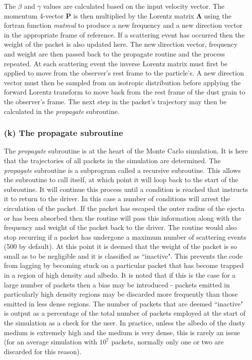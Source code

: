 		The $\beta$ and $\gamma$ values are calculated based on the input velocity vector.  The momentum 4-vector $\boldsymbol{P}$ is then multiplied by the Lorentz matrix $\boldsymbol{\Lambda}$ using the {\sc fortran} function \textit{matmul} to produce a  new frequency and a new direction vector in the appropriate frame of reference.  If a scattering event has occurred then the weight of the packet is also updated here.  The new direction vector, frequency and weight are then passed back to the propagate routine and the process repeated.   At each scattering event the inverse Lorentz matrix must first be applied to move from the observer's rest frame to the particle's.  A new direction vector must then be sampled from an isotropic distribution before applying the forward Lorentz transform to move back from the rest frame of the dust grain to the observer's frame.  The next step in the packet's trajectory may then be calculated in the \textit{propagate} subroutine.
		
		\subsubsection{(k) The propagate subroutine}
		The \textit{propagate} subroutine is at the heart of the Monte Carlo simulation.  It is here that the trajectories of all packets in the simulation are determined.  The \textit{propagate} subroutine is a subprogram called a recursive subroutine.  This allows the subroutine to call itself, at which point it will loop back to the start of the subroutine.  It will continue this process until a condition is reached that instructs it to return to the driver.  In this case a number of conditions will arrest the circulation of the packet. If the packet has escaped the outer radius of the ejecta or has been absorbed then the routine will pass this information along with the frequency and weight of the packet back to the driver.  The routine would also stop recurring if a packet has undergone a maximum number of scattering events (500 by default).  At this point it is deemed that the weight of the packet is so small as to be negligible and it is classified as ``inactive".  This prevents the code from lagging by becoming stuck on a particular packet that has become trapped in a region of high density and albedo. It is noted that if this is the case for a large number of packets then a bias may be introduced - packets emitted in particularly high density regions may be discarded more frequently than those emitted in less dense regions.  The number of packets that are deemed ``inactive" is output as a percentage of the total number of packets employed at the start of the simulation as a check for the user.  In practice, unless the albedo of the dusty medium is extremely high and the medium is very dense, this is rarely an issue (for an average simulation with $10^7$ packets, normally only one or two are discarded for this reason). 
				

